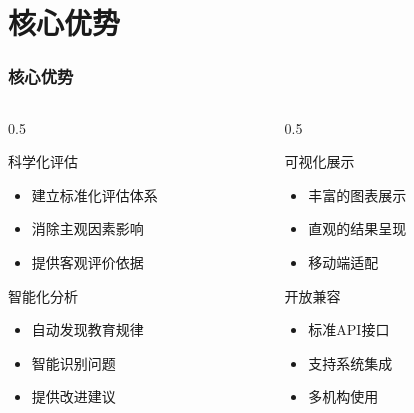 \documentclass[aspectratio=169]{beamer}
\begin{document}
\section{核心优势}

\begin{frame}
    \frametitle{核心优势}
    \begin{columns}
        \begin{column}{0.5\textwidth}
            \begin{block}{科学化评估}
                \begin{itemize}
                    \item 建立标准化评估体系
                    \item 消除主观因素影响
                    \item 提供客观评价依据
                \end{itemize}
            \end{block}
            
            \begin{block}{智能化分析}
                \begin{itemize}
                    \item 自动发现教育规律
                    \item 智能识别问题
                    \item 提供改进建议
                \end{itemize}
            \end{block}
        \end{column}
        
        \begin{column}{0.5\textwidth}
            \begin{block}{可视化展示}
                \begin{itemize}
                    \item 丰富的图表展示
                    \item 直观的结果呈现
                    \item 移动端适配
                \end{itemize}
            \end{block}
            
            \begin{block}{开放兼容}
                \begin{itemize}
                    \item 标准API接口
                    \item 支持系统集成
                    \item 多机构使用
                \end{itemize}
            \end{block}
        \end{column}
    \end{columns}
\end{frame}
\end{document}
